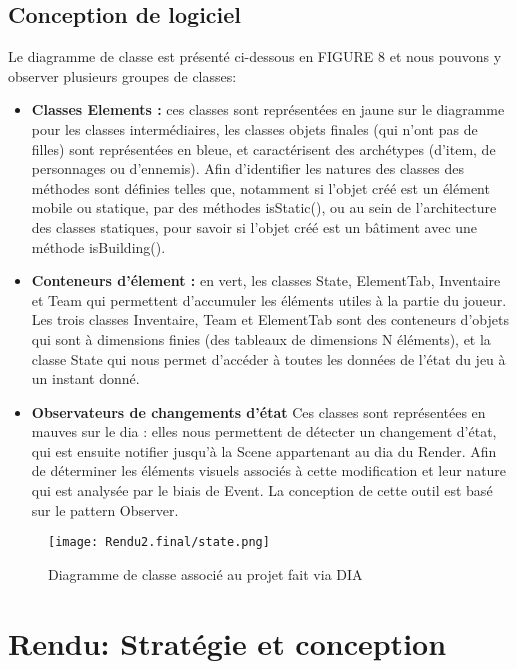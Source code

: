 \documentclass[a4paper,12pt]{article}
\begin{document}
\subsection{Conception de logiciel}
Le diagramme de classe est présenté ci-dessous en FIGURE 8 et nous pouvons y observer plusieurs groupes de classes: 
\begin{itemize}
    \item \textbf{Classes Elements :} ces classes sont représentées en jaune sur le diagramme pour les classes intermédiaires, les classes objets finales (qui n'ont pas de filles) sont représentées en bleue, et caractérisent des archétypes (d'item, de personnages ou d'ennemis). Afin d'identifier les natures des classes des méthodes sont définies telles que, notamment si l'objet créé est un élément mobile ou statique, par des méthodes isStatic(), ou au sein de l'architecture des classes statiques, pour savoir si l'objet créé est un bâtiment avec une méthode isBuilding(). 
    \item \textbf{Conteneurs d'élement :} en vert, les classes State, ElementTab, Inventaire et Team qui permettent d'accumuler les éléments utiles à la partie du joueur. Les trois classes Inventaire, Team et ElementTab sont des conteneurs d'objets qui sont à dimensions finies (des tableaux de dimensions N éléments), et la classe State qui nous permet d'accéder à toutes les données de l'état du jeu à un instant donné. 
    \item \textbf{Observateurs de changements d'état} Ces classes sont représentées en mauves sur le dia : elles nous permettent de détecter un changement d'état, qui est ensuite notifier jusqu'à la Scene appartenant au dia du Render. Afin de déterminer les éléments visuels associés à cette modification et leur nature qui est analysée par le biais de Event. La conception de cette outil est basé sur le pattern Observer. 
\end{itemize}

\begin{figure}[!ht]
  \centering
  \texttt{[image: Rendu2.final/state.png]}
  \caption{Diagramme de classe associé au projet fait via DIA}
\end{figure}
\clearpage
\newpage
\section{Rendu: Stratégie et conception}
\end{document}
